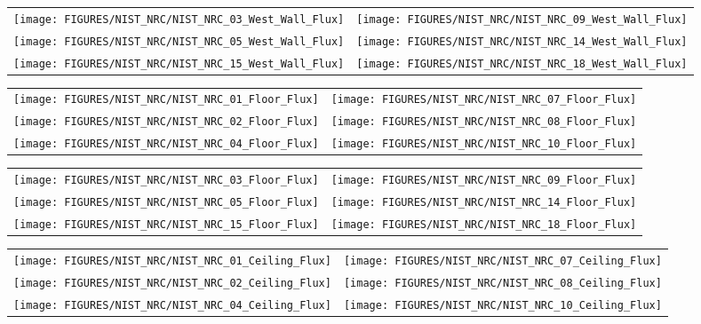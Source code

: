 \begin{figure}[p]
\begin{tabular*}{\textwidth}{l@{\extracolsep{\fill}}r}
\texttt{[image: FIGURES/NIST\_NRC/NIST\_NRC\_03\_West\_Wall\_Flux]} &
\texttt{[image: FIGURES/NIST\_NRC/NIST\_NRC\_09\_West\_Wall\_Flux]} \\
\texttt{[image: FIGURES/NIST\_NRC/NIST\_NRC\_05\_West\_Wall\_Flux]} &
\texttt{[image: FIGURES/NIST\_NRC/NIST\_NRC\_14\_West\_Wall\_Flux]} \\
\texttt{[image: FIGURES/NIST\_NRC/NIST\_NRC\_15\_West\_Wall\_Flux]} &
\texttt{[image: FIGURES/NIST\_NRC/NIST\_NRC\_18\_West\_Wall\_Flux]}
\end{tabular*}
\label{NIST_NRC_West_Wall_Flux_Open}
\end{figure}

\begin{figure}[p]
\begin{tabular*}{\textwidth}{l@{\extracolsep{\fill}}r}
\texttt{[image: FIGURES/NIST\_NRC/NIST\_NRC\_01\_Floor\_Flux]} &
\texttt{[image: FIGURES/NIST\_NRC/NIST\_NRC\_07\_Floor\_Flux]} \\
\texttt{[image: FIGURES/NIST\_NRC/NIST\_NRC\_02\_Floor\_Flux]} &
\texttt{[image: FIGURES/NIST\_NRC/NIST\_NRC\_08\_Floor\_Flux]} \\
\texttt{[image: FIGURES/NIST\_NRC/NIST\_NRC\_04\_Floor\_Flux]} &
\texttt{[image: FIGURES/NIST\_NRC/NIST\_NRC\_10\_Floor\_Flux]}
\end{tabular*}
\label{NIST_NRC_Floor_Flux_Closed}
\end{figure}

\begin{figure}[p]
\begin{tabular*}{\textwidth}{l@{\extracolsep{\fill}}r}
\texttt{[image: FIGURES/NIST\_NRC/NIST\_NRC\_03\_Floor\_Flux]} &
\texttt{[image: FIGURES/NIST\_NRC/NIST\_NRC\_09\_Floor\_Flux]} \\
\texttt{[image: FIGURES/NIST\_NRC/NIST\_NRC\_05\_Floor\_Flux]} &
\texttt{[image: FIGURES/NIST\_NRC/NIST\_NRC\_14\_Floor\_Flux]} \\
\texttt{[image: FIGURES/NIST\_NRC/NIST\_NRC\_15\_Floor\_Flux]} &
\texttt{[image: FIGURES/NIST\_NRC/NIST\_NRC\_18\_Floor\_Flux]}
\end{tabular*}
\label{NIST_NRC_Floor_Flux_Open}
\end{figure}


\begin{figure}[p]
\begin{tabular*}{\textwidth}{l@{\extracolsep{\fill}}r}
\texttt{[image: FIGURES/NIST\_NRC/NIST\_NRC\_01\_Ceiling\_Flux]} &
\texttt{[image: FIGURES/NIST\_NRC/NIST\_NRC\_07\_Ceiling\_Flux]} \\
\texttt{[image: FIGURES/NIST\_NRC/NIST\_NRC\_02\_Ceiling\_Flux]} &
\texttt{[image: FIGURES/NIST\_NRC/NIST\_NRC\_08\_Ceiling\_Flux]} \\
\texttt{[image: FIGURES/NIST\_NRC/NIST\_NRC\_04\_Ceiling\_Flux]} &
\texttt{[image: FIGURES/NIST\_NRC/NIST\_NRC\_10\_Ceiling\_Flux]}
\end{tabular*}
\label{NIST_NRC_Ceiling_Flux_Closed}
\end{figure}

